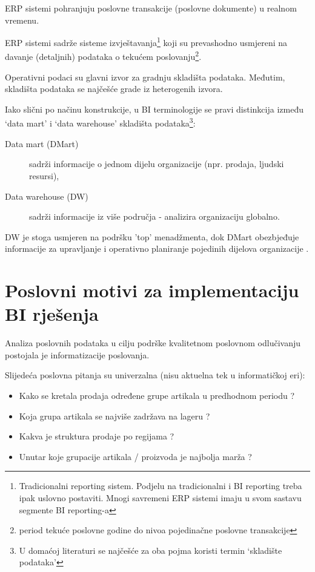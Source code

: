 \documentclass[times, utf8, seminar]{fit}
\begin{document}
ERP sistemi pohranjuju poslovne transakcije (poslovne dokumente) u realnom vremenu.

ERP sistemi sadrže sisteme izvještavanja\footnote{ Tradicionalni reporting sistem. Podjelu na tradicionalni i BI reporting treba ipak uslovno postaviti. Mnogi savremeni ERP sistemi imaju u svom sastavu segmente BI reporting-a} koji su prevashodno usmjereni na davanje (detaljnih) podataka o tekućem poslovanju\footnote{period tekuće poslovne godine do nivoa pojedinačne poslovne transakcije}. 
 
Operativni podaci su glavni izvor za gradnju skladišta podataka. Međutim, skladišta podataka se najčešće grade iz heterogenih izvora.

Iako slični po načinu konstrukcije, u BI terminologije se pravi distinkcija  između `data mart' i `data warehouse' skladišta podataka\footnote{U domaćoj literaturi se najčešće za oba pojma koristi termin `skladište podataka'}:  

\begin{description}
  \item [Data mart (DMart)] sadrži informacije o jednom dijelu organizacije (npr. prodaja, ljudski resursi),
  \item [Data warehouse (DW)] sadrži informacije iz više područja - analizira organizaciju globalno.
\end{description}
 
DW je stoga usmjeren na podršku 'top' menadžmenta, dok DMart obezbjeđuje informacije za upravljanje i operativno planiranje pojedinih dijelova organizacije \cite[str.~391]{pentaho32}.

\section{Poslovni motivi za implementaciju BI rješenja}

Analiza poslovnih podataka u cilju podrške kvalitetnom poslovnom odlučivanju postojala je informatizacije poslovanja.

Slijedeća poslovna pitanja su univerzalna (nisu aktuelna tek u informatičkoj eri):

\begin{itemize}
  \item Kako se kretala prodaja određene grupe artikala u predhodnom periodu ?
  \item Koja grupa artikala se najviše zadržava na lageru ?
  \item Kakva je struktura prodaje po regijama ?
  \item Unutar koje grupacije artikala / proizvoda je najbolja marža ?
\end{itemize} 
\end{document}
